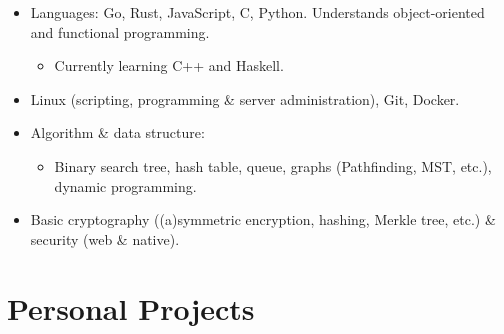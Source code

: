   \begin{itemize}[itemsep=0.1\parskip]
    \item Languages: Go, Rust, JavaScript, C, Python. Understands object-oriented and functional programming.

    \begin{itemize}
      \item Currently learning C++ and Haskell.
    \end{itemize}

    \item Linux (scripting, programming \& server administration), Git, Docker.

    \item Algorithm \& data structure:

    \begin{itemize}
      \item Binary search tree, hash table, queue, graphs (Pathfinding, MST, etc.), dynamic programming.
    \end{itemize}

    \item Basic cryptography ((a)symmetric encryption, hashing, Merkle tree, etc.) \& security (web \& native).

  \end{itemize}

  \section{Personal Projects}

  \def\ghurl#1{%
    \href{#1}{({\blueghicon{}})}%
  }

